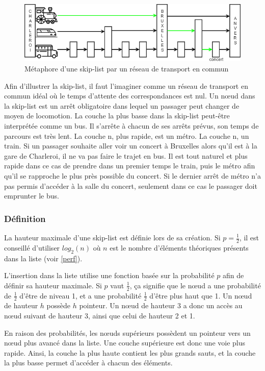 \documentclass[hidelinks,a4paper, 12pt]{article}
\begin{document}
	\begin{figure}[h]
		\includegraphics[width=\textwidth]{img/metaphore}
		\caption{Métaphore d'une skip-list par un réseau de transport en commun}
		\label{skip-meta}
	\end{figure}
	
	Afin d'illustrer la skip-list, il faut l'imaginer comme un réseau de transport en commun idéal où le temps d'attente des correspondances est nul. Un nœud dans la skip-list est un arrêt obligatoire dans lequel un passager peut changer de moyen de locomotion. La couche la plus basse dans la skip-list peut-être interprétée comme un bus. Il s'arrête à chacun de ses arrêts prévus, son temps de parcours est très lent. La couche n, plus rapide, est un métro. La couche n, un train. Si un passager souhaite aller voir un concert à Bruxelles alors qu'il est à la gare de Charleroi, il ne va pas faire le trajet en bus. Il est tout naturel et plus rapide dans ce cas de prendre dans un premier temps le train, puis le métro afin qu'il se rapproche le plus près possible du concert. Si le dernier arrêt de métro n'a pas permis d'accéder à la salle du concert, seulement dans ce cas le passager doit emprunter le bus.
	
	\subsubsection*{Définition}
	La hauteur maximale d'une skip-list est définie lors de sa création. Si $p=\frac{1}{2}$, il est conseillé d'utiliser $log_2(n)$ où $n$ est le nombre d'éléments théoriques présents dans la liste (voir \cref{perf}).
	
	L'insertion dans la liste utilise une fonction basée sur la probabilité $p$ afin de définir sa hauteur maximale. Si $p$ vaut $\frac{1}{2}$, ça signifie que le nœud a une probabilité de $\frac{1}{2}$ d'être de niveau 1, et a une probabilité $\frac{1}{2}$ d'être plus haut que 1. Un nœud de hauteur $h$ possède $h$ pointeur. Un nœud de hauteur 3 a donc un accès au nœud suivant de hauteur 3, ainsi que celui de hauteur 2 et 1.
	
	En raison des probabilités, les nœuds supérieurs possèdent un pointeur vers un nœud plus avancé dans la liste. Une couche supérieure est donc une voie plus rapide. Ainsi, la couche la plus haute contient les plus grands sauts, et la couche la plus basse permet d'accéder à chacun des éléments.
		
\end{document}
